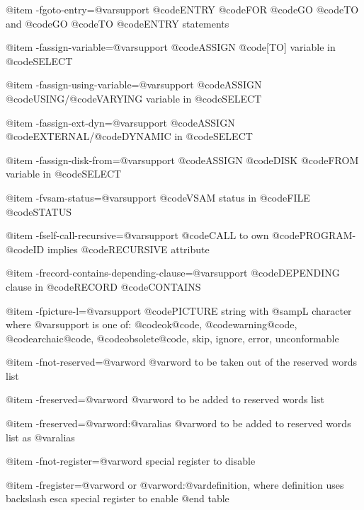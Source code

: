 @item -fgoto-entry=@var{support}
@code{ENTRY} @code{FOR} @code{GO} @code{TO} and @code{GO} @code{TO} @code{ENTRY} statements

@item -fassign-variable=@var{support}
@code{ASSIGN} @code{[TO]} variable in @code{SELECT}

@item -fassign-using-variable=@var{support}
@code{ASSIGN} @code{USING}/@code{VARYING} variable in @code{SELECT}

@item -fassign-ext-dyn=@var{support}
@code{ASSIGN} @code{EXTERNAL}/@code{DYNAMIC} in @code{SELECT}

@item -fassign-disk-from=@var{support}
@code{ASSIGN} @code{DISK} @code{FROM} variable in @code{SELECT}

@item -fvsam-status=@var{support}
@code{VSAM} status in @code{FILE} @code{STATUS}

@item -fself-call-recursive=@var{support}
@code{CALL} to own @code{PROGRAM}-@code{ID} implies @code{RECURSIVE} attribute

@item -frecord-contains-depending-clause=@var{support}
@code{DEPENDING} clause in @code{RECORD} @code{CONTAINS}

@item -fpicture-l=@var{support}
@code{PICTURE} string with @samp{L} character
	where @var{support} is one of:
	@code{ok@code{, @code{warning@code{, @code{archaic@code{, @code{obsolete@code{, }skip}, }ignore}, }error}, }unconformable}

@item -fnot-reserved=@var{word}
@var{word} to be taken out of the reserved words list

@item -freserved=@var{word}
@var{word} to be added to reserved words list

@item -freserved=@var{word}:@var{alias}
@var{word} to be added to reserved words list as @var{alias}

@item -fnot-register=@var{word}
special register to disable

@item -fregister=@var{word} or @var{word}:@var{definition}, where definition uses backslash esca
special register to enable
@end table
